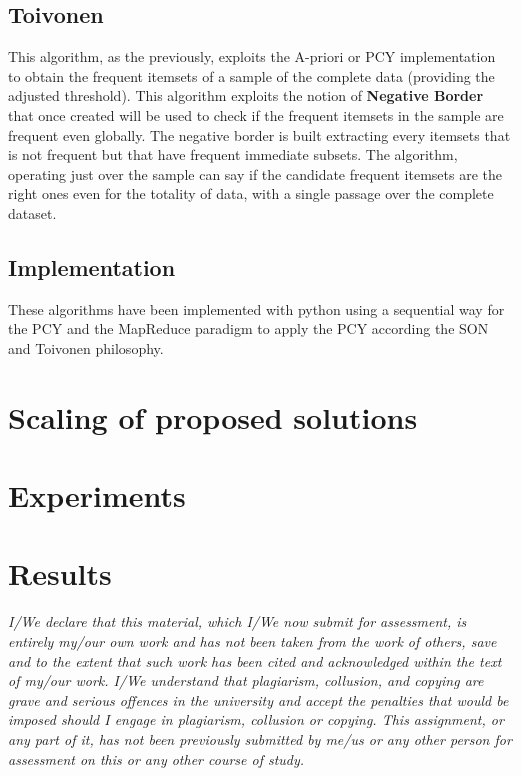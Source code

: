 \documentclass[14pt]{extarticle}
\begin{document}
\subsection{Toivonen}
This algorithm, as the previously, exploits the A-priori or PCY implementation to obtain the frequent itemsets of a sample of the complete data (providing the adjusted threshold). This algorithm exploits the notion of \textbf{Negative Border} that once created will be used to check if the frequent itemsets in the sample are frequent even globally. The negative border is built extracting every itemsets that is not frequent but that have frequent immediate subsets. The algorithm, operating just over the sample can say if the candidate frequent itemsets are the right ones even for the totality of data, with a single passage over the complete dataset.
\subsection{Implementation}
These algorithms have been implemented with python using a sequential way for the PCY and the MapReduce paradigm to apply the PCY according the SON and Toivonen philosophy.


\section{Scaling of proposed solutions}
\section{Experiments}
\section{Results}
{\it I/We declare that this material, which I/We now submit for assessment, is entirely my/our own work and has not been taken from the work of others, save and to the extent that such work has been cited and acknowledged within the text of my/our work. I/We understand that plagiarism, collusion, and copying are grave and serious offences in the university and accept the penalties that would be imposed should I engage in plagiarism, collusion or copying. This assignment, or any part of it, has not been previously submitted by me/us or any other person for assessment on this or any other course of study.}

\begin{comment}
The report should contain the following information:

-the chosen dataset, and the parts of the latter which have been considered,
-how data have been organized,
-the applied pre-processing techniques,
-the considered algorithms and their implementations,
-how the proposed solution scales up with data size,
-a description of the experiments,
-comments and discussion on the experimental results.

\end{comment}
\end{document}
